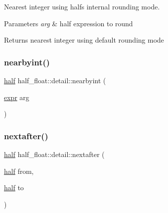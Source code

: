 Nearest integer using half\textquotesingle{}s internal rounding mode. 
\begin{DoxyParams}{Parameters}
{\em arg} & half expression to round \\
\hline
\end{DoxyParams}
\begin{DoxyReturn}{Returns}
nearest integer using default rounding mode 
\end{DoxyReturn}
\mbox{\label{namespacehalf__float_1_1detail_aebcfe947c8904d558b9a572d13b7a3ae}} 
\subsubsection{\texorpdfstring{nearbyint()}{nearbyint()}\hspace{0.1cm}{\footnotesize\ttfamily [2/2]}}
{\footnotesize\ttfamily \hyperlink{classhalf__float_1_1half}{half} half\+\_\+float\+::detail\+::nearbyint (\begin{DoxyParamCaption}\item[{\hyperlink{structhalf__float_1_1detail_1_1expr}{expr}}]{arg }\end{DoxyParamCaption})\hspace{0.3cm}{\ttfamily [inline]}}

\mbox{\label{namespacehalf__float_1_1detail_abaff6defbabab12cdfbb47ebf2d757a8}} 
\subsubsection{\texorpdfstring{nextafter()}{nextafter()}\hspace{0.1cm}{\footnotesize\ttfamily [1/4]}}
{\footnotesize\ttfamily \hyperlink{classhalf__float_1_1half}{half} half\+\_\+float\+::detail\+::nextafter (\begin{DoxyParamCaption}\item[{\hyperlink{classhalf__float_1_1half}{half}}]{from,  }\item[{\hyperlink{classhalf__float_1_1half}{half}}]{to }\end{DoxyParamCaption})\hspace{0.3cm}{\ttfamily [inline]}}

